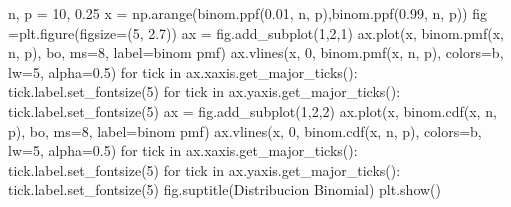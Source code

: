 \documentclass[
  letterpaper,
  DIV=11,
  numbers=noendperiod]{scrreprt}
\newenvironment{Shaded}{\begin{snugshade}}{\end{snugshade}}
\newcommand{\ControlFlowTok}[1]{\textcolor[rgb]{0.00,0.23,0.31}{#1}}
\newcommand{\DecValTok}[1]{\textcolor[rgb]{0.68,0.00,0.00}{#1}}
\newcommand{\FloatTok}[1]{\textcolor[rgb]{0.68,0.00,0.00}{#1}}
\newcommand{\KeywordTok}[1]{\textcolor[rgb]{0.00,0.23,0.31}{#1}}
\newcommand{\NormalTok}[1]{\textcolor[rgb]{0.00,0.23,0.31}{#1}}
\newcommand{\OperatorTok}[1]{\textcolor[rgb]{0.37,0.37,0.37}{#1}}
\newcommand{\StringTok}[1]{\textcolor[rgb]{0.13,0.47,0.30}{#1}}
\begin{document}
\begin{Shaded}
\begin{Highlighting}[]
\NormalTok{n, p }\OperatorTok{=} \DecValTok{10}\NormalTok{, }\FloatTok{0.25}
\NormalTok{x }\OperatorTok{=}\NormalTok{ np.arange(binom.ppf(}\FloatTok{0.01}\NormalTok{, n, p),binom.ppf(}\FloatTok{0.99}\NormalTok{, n, p))}
\NormalTok{fig }\OperatorTok{=}\NormalTok{plt.figure(figsize}\OperatorTok{=}\NormalTok{(}\DecValTok{5}\NormalTok{, }\FloatTok{2.7}\NormalTok{))}
\NormalTok{ax }\OperatorTok{=}\NormalTok{ fig.add\_subplot(}\DecValTok{1}\NormalTok{,}\DecValTok{2}\NormalTok{,}\DecValTok{1}\NormalTok{)}
\NormalTok{ax.plot(x, binom.pmf(x, n, p), }\StringTok{\textquotesingle{}bo\textquotesingle{}}\NormalTok{, ms}\OperatorTok{=}\DecValTok{8}\NormalTok{, label}\OperatorTok{=}\StringTok{\textquotesingle{}binom pmf\textquotesingle{}}\NormalTok{)}
\NormalTok{ax.vlines(x, }\DecValTok{0}\NormalTok{, binom.pmf(x, n, p), colors}\OperatorTok{=}\StringTok{\textquotesingle{}b\textquotesingle{}}\NormalTok{, lw}\OperatorTok{=}\DecValTok{5}\NormalTok{, alpha}\OperatorTok{=}\FloatTok{0.5}\NormalTok{)}
\ControlFlowTok{for}\NormalTok{ tick }\KeywordTok{in}\NormalTok{ ax.xaxis.get\_major\_ticks():}
\NormalTok{  tick.label.set\_fontsize(}\DecValTok{5}\NormalTok{)}
\ControlFlowTok{for}\NormalTok{ tick }\KeywordTok{in}\NormalTok{ ax.yaxis.get\_major\_ticks():}
\NormalTok{  tick.label.set\_fontsize(}\DecValTok{5}\NormalTok{) }
\NormalTok{ax }\OperatorTok{=}\NormalTok{ fig.add\_subplot(}\DecValTok{1}\NormalTok{,}\DecValTok{2}\NormalTok{,}\DecValTok{2}\NormalTok{)}
\NormalTok{ax.plot(x, binom.cdf(x, n, p), }\StringTok{\textquotesingle{}bo\textquotesingle{}}\NormalTok{, ms}\OperatorTok{=}\DecValTok{8}\NormalTok{, label}\OperatorTok{=}\StringTok{\textquotesingle{}binom pmf\textquotesingle{}}\NormalTok{)}
\NormalTok{ax.vlines(x, }\DecValTok{0}\NormalTok{, binom.cdf(x, n, p), colors}\OperatorTok{=}\StringTok{\textquotesingle{}b\textquotesingle{}}\NormalTok{, lw}\OperatorTok{=}\DecValTok{5}\NormalTok{, alpha}\OperatorTok{=}\FloatTok{0.5}\NormalTok{)}
\ControlFlowTok{for}\NormalTok{ tick }\KeywordTok{in}\NormalTok{ ax.xaxis.get\_major\_ticks():}
\NormalTok{  tick.label.set\_fontsize(}\DecValTok{5}\NormalTok{)}
\ControlFlowTok{for}\NormalTok{ tick }\KeywordTok{in}\NormalTok{ ax.yaxis.get\_major\_ticks():}
\NormalTok{  tick.label.set\_fontsize(}\DecValTok{5}\NormalTok{)}
\NormalTok{fig.suptitle(}\StringTok{\textquotesingle{}Distribucion Binomial\textquotesingle{}}\NormalTok{)}
\NormalTok{plt.show()}
\end{Highlighting}
\end{Shaded}
\end{document}

